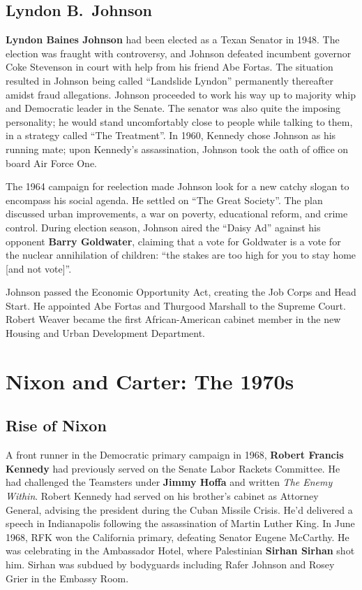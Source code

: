 \subsection*{Lyndon B.\ Johnson}

\textbf{Lyndon Baines Johnson} had been elected as a Texan Senator in 1948.
The election was fraught with controversy,
and Johnson defeated incumbent governor Coke Stevenson in court with help from his friend Abe Fortas.
The situation resulted in Johnson being called ``Landslide Lyndon'' permanently thereafter amidst fraud allegations.
Johnson proceeded to work his way up to majority whip and Democratic leader in the Senate.
The senator was also quite the imposing personality;
he would stand uncomfortably close to people while talking to them, in a strategy called ``The Treatment''.
In 1960, Kennedy chose Johnson as his running mate;
upon Kennedy's assassination, Johnson took the oath of office on board Air Force One.

The 1964 campaign for reelection made Johnson look for a new catchy slogan to encompass his social agenda.
He settled on ``The Great Society''.
The plan discussed urban improvements, a war on poverty, educational reform, and crime control.
During election season, Johnson aired the ``Daisy Ad'' against his opponent \textbf{Barry Goldwater},
claiming that a vote for Goldwater is a vote for the nuclear annihilation of children:
``the stakes are too high for you to stay home [and not vote]''.

Johnson passed the Economic Opportunity Act, creating the Job Corps and Head Start.
He appointed Abe Fortas and Thurgood Marshall to the Supreme Court.
Robert Weaver became the first African-American cabinet member in the new Housing and Urban Development Department.

\section{Nixon and Carter: The 1970s}

\subsection*{Rise of Nixon}

A front runner in the Democratic primary campaign in 1968,
\textbf{Robert Francis Kennedy} had previously served on the Senate Labor Rackets Committee.
He had challenged the Teamsters under \textbf{Jimmy Hoffa} and written \textit{The Enemy Within}.
Robert Kennedy had served on his brother's cabinet as Attorney General,
advising the president during the Cuban Missile Crisis.
He'd delivered a speech in Indianapolis following the assassination of Martin Luther King.
In June 1968, RFK won the California primary, defeating Senator Eugene McCarthy.
He was celebrating in the Ambassador Hotel,
where Palestinian \textbf{Sirhan Sirhan} shot him.
Sirhan was subdued by bodyguards including Rafer Johnson and Rosey Grier in the Embassy Room.

